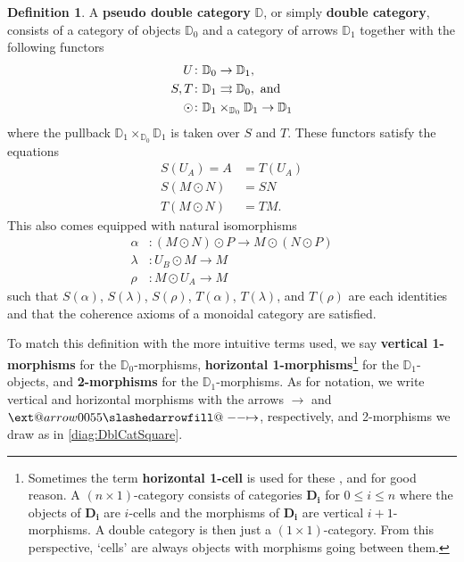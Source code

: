 \documentclass{tac}
\makeatletter
\newcommand{\dblcat}[1]{\mathbb{#1}}
\renewcommand{\t}[1]{\textup{#1}}
\newcommand{\from}{\colon}
\def\slashedarrowfill@#1#2#3#4#5{%
	$\m@th\thickmuskip0mu\medmuskip\thickmuskip\thinmuskip\thickmuskip
	\relax#5#1\mkern-7mu%
	\cleaders\hbox{$#5\mkern-2mu#2\mkern-2mu$}\hfill
	\mathclap{#3}\mathclap{#2}%
	\cleaders\hbox{$#5\mkern-2mu#2\mkern-2mu$}\hfill
	\mkern-7mu#4$%
}
\def\rightslashedarrowfill@{%
	\slashedarrowfill@\relbar\relbar\mapstochar\rightarrow}
\newcommand{\xslashedrightarrow}[2][]{%
	\ext@arrow 0055{\rightslashedarrowfill@}{#1}{#2}}
\newcommand{\hto}{\xslashedrightarrow{}}
\theoremstyle{remark}
\theoremstyle{definition}
\newtheorem{defn}[thm]{Definition}
\makeatother
\begin{document}
%
\begin{defn}
	\label{def:DoubleCategory}
	A \textbf{pseudo double category} $\dblcat{D}$, 
	or simply \textbf{double category}, consists of 
	a category of objects $\dblcat{D}_{0}$ and 
	a category of arrows $\dblcat{D}_{1}$ together
	with the following functors
	\begin{equation*}
		\begin{split}
			U & 
				\from \dblcat{D}_{0} \to \dblcat{D}_{1}, \\
			S,T & 
				\from \dblcat{D}_{1} \rightrightarrows \dblcat{D}_{0}, \t{ and} \\
			\odot & 
				\from \dblcat{D}_{1} \times_{\dblcat{D}_{0}} \dblcat{D}_{1} 
					\to \dblcat{D}_{1}
		\end{split}
	\end{equation*}
	where the pullback 
		$\dblcat{D}_{1} \times_{\dblcat{D}_{0}} \dblcat{D}_{1}$ 
	is taken over $S$ and $T$.  
	These functors satisfy the equations
	\begin{equation*}
		\begin{split}
			S(U_{A}) = A & = T(U_{A}) \\
			S(M \odot N) & = SN \\
			T(M \odot N) & = TM. 
	\end{split}
	\end{equation*}
	This also comes equipped with natural isomorphisms
	\begin{equation*}
		\begin{split}
		\alpha & \from (M \odot N) \odot P \to M \odot (N \odot P)\\
		\lambda & \from U_{B} \odot M \to M\\
		\rho & \from M \odot U_{A} \to M
	\end{split}
	\end{equation*}
	such that 
		$S(\alpha)$, 
		$S(\lambda)$, 
		$S(\rho)$, 
		$T(\alpha)$, 
		$T(\lambda)$, and 
		$T(\rho)$ 
	are each identities and that 
	the coherence axioms of a monoidal category are satisfied. 
	
	To match this definition with the more intuitive terms used, we say
	\textbf{vertical 1-morphisms} for the $\dblcat{D}_{0}$-morphisms,
	\textbf{horizontal 1-morphisms}\footnote{Sometimes the term \textbf{horizontal 1-cell} is used for these \cite{Shul}, and for good reason. A $(n \times 1)$-category consists of categories $\mathbf{D_i}$ for $0 \leq i \leq n$ where the objects of $\mathbf{D_i}$ are $i$-cells and the morphisms of $\mathbf{D_i}$ are vertical $i+1$-morphisms. A double category is then just a $(1 \times 1)$-category. From this perspective, `cells' are always objects with morphisms going between them.} for the $\dblcat{D}_{1}$-objects, and
	\textbf{2-morphisms} for the $\dblcat{D}_{1}$-morphisms. 
	As for notation, we write vertical and horizontal morphisms 
	with the arrows $\to$ and $\hto$, respectively, and 
	2-morphisms we draw as in 
		\eqref{diag:DblCatSquare}.
\end{defn}
\end{document}
